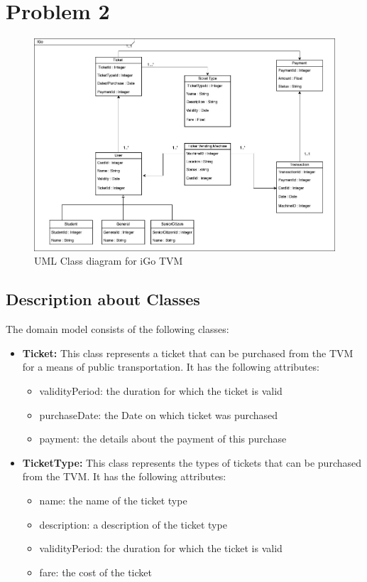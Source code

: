\documentclass[a4paper, 11pt]{report}
\begin{document}
\chapter{Problem 2}
\begin{figure}[h]
    \centering
    \includegraphics[scale=0.35]{Problem2_UML_iGo.jpg}
    \caption{UML Class diagram for iGo TVM}
    \label{fig:UML class diagram for iGo TVM}
\end{figure}


\section{Description about Classes}
The domain model consists of the following classes:

\begin{itemize}
  \item \textbf{Ticket: }
    This class represents a ticket that can be purchased from the TVM for a means of public transportation. It has the following attributes:
    \begin{itemize}
    \item validityPeriod: the duration for which the ticket is valid
     \item purchaseDate: the Date on which ticket was purchased
     \item payment: the details about the payment of this purchase
    \end{itemize}  
          
    \item \textbf{TicketType: }This class represents the types of tickets that can be purchased from the TVM. 
    It has the following attributes:
        \begin{itemize}
        \item name: the name of the ticket type
        \item description: a description of the ticket type
        \item validityPeriod: the duration for which the ticket is valid
        \item fare: the cost of the ticket
        \end{itemize}
     \end{itemize}   
     
\end{document}
